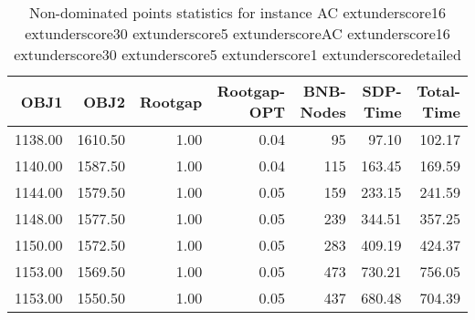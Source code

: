\begin{table}
\caption{Non-dominated points statistics for instance AC	extunderscore16	extunderscore30	extunderscore5	extunderscoreAC	extunderscore16	extunderscore30	extunderscore5	extunderscore1	extunderscoredetailed}
\label{tab:stats/AC_16_30_5_AC_16_30_5_1_detailed}
\begin{tabular}{rrrrrrr}
\toprule
OBJ1 & OBJ2 & Rootgap & Rootgap-OPT & BNB-Nodes & SDP-Time & Total-Time \\
\midrule
1138.00 & 1610.50 & 1.00 & 0.04 & 95 & 97.10 & 102.17 \\
1140.00 & 1587.50 & 1.00 & 0.04 & 115 & 163.45 & 169.59 \\
1144.00 & 1579.50 & 1.00 & 0.05 & 159 & 233.15 & 241.59 \\
1148.00 & 1577.50 & 1.00 & 0.05 & 239 & 344.51 & 357.25 \\
1150.00 & 1572.50 & 1.00 & 0.05 & 283 & 409.19 & 424.37 \\
1153.00 & 1569.50 & 1.00 & 0.05 & 473 & 730.21 & 756.05 \\
1153.00 & 1550.50 & 1.00 & 0.05 & 437 & 680.48 & 704.39 \\
\bottomrule
\end{tabular}
\end{table}
